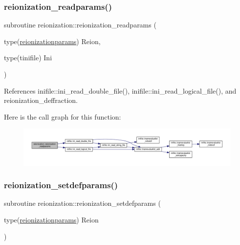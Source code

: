 \subsubsection{\texorpdfstring{reionization\+\_\+readparams()}{reionization\_readparams()}}
{\footnotesize\ttfamily subroutine reionization\+::reionization\+\_\+readparams (\begin{DoxyParamCaption}\item[{type(\mbox{\hyperlink{structreionization_1_1reionizationparams}{reionizationparams}})}]{Reion,  }\item[{type(tinifile)}]{Ini }\end{DoxyParamCaption})}



References inifile\+::ini\+\_\+read\+\_\+double\+\_\+file(), inifile\+::ini\+\_\+read\+\_\+logical\+\_\+file(), and reionization\+\_\+deffraction.

Here is the call graph for this function\+:
\nopagebreak
\begin{figure}[H]
\begin{center}
\leavevmode
\includegraphics[width=350pt]{namespacereionization_a8d8a4a4fcaa0e1adc50de9a45143d2f8_cgraph}
\end{center}
\end{figure}
\mbox{\label{namespacereionization_acd4c0417f4ec9bc6d5c9b6bea2b7b035}} 
\subsubsection{\texorpdfstring{reionization\+\_\+setdefparams()}{reionization\_setdefparams()}}
{\footnotesize\ttfamily subroutine reionization\+::reionization\+\_\+setdefparams (\begin{DoxyParamCaption}\item[{type(\mbox{\hyperlink{structreionization_1_1reionizationparams}{reionizationparams}})}]{Reion }\end{DoxyParamCaption})}



